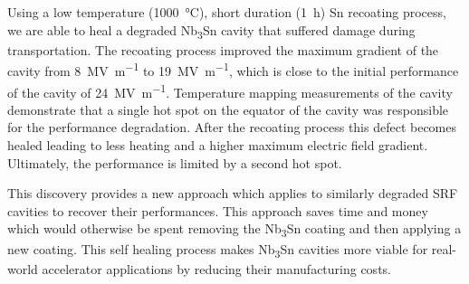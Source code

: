 \documentclass{revtex4-2}
\begin{document}
Using a low temperature (\qty{1000}{\degreeCelsius}), short duration (\qty{1}{\hour}) Sn recoating process, we are able to heal a degraded Nb\textsubscript{3}Sn cavity that suffered damage during transportation. The recoating process improved the maximum gradient of the cavity from \qty{8}{\mega\volt\per\meter} to \qty{19}{\mega\volt\per\meter}, which is close to the initial performance of the cavity of \qty{24}{\mega\volt\per\meter}. Temperature mapping measurements of the cavity demonstrate that a single hot spot on the equator of the cavity was responsible for the performance degradation. After the recoating process this defect becomes healed leading to less heating and a higher maximum electric field gradient. Ultimately, the performance is limited by a second hot spot.

This discovery provides a new approach which applies to similarly degraded SRF cavities to recover their performances. This approach saves time and money which would otherwise be spent removing the Nb\textsubscript{3}Sn coating and then applying a new coating. This self healing process makes Nb\textsubscript{3}Sn cavities more viable for real-world accelerator applications by reducing their manufacturing costs.





\end{document}
